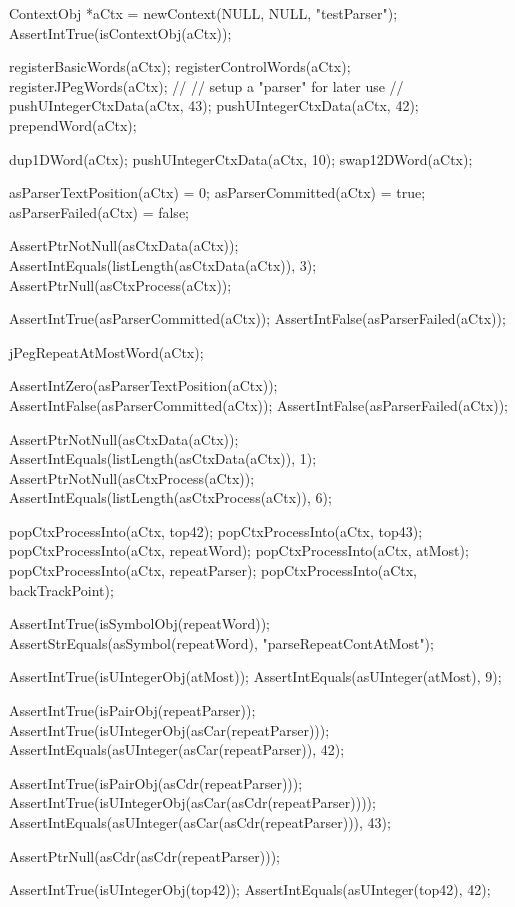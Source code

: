 \startCTest
  ContextObj *aCtx = newContext(NULL, NULL, "testParser");
  AssertIntTrue(isContextObj(aCtx));
  
  registerBasicWords(aCtx);
  registerControlWords(aCtx);
  registerJPegWords(aCtx);
  //
  // setup a "parser" for later use
  //
  pushUIntegerCtxData(aCtx, 43);
  pushUIntegerCtxData(aCtx, 42);
  prependWord(aCtx);
  
  dup1DWord(aCtx);
  pushUIntegerCtxData(aCtx, 10);
  swap12DWord(aCtx);
  
  asParserTextPosition(aCtx) = 0;
  asParserCommitted(aCtx)    = true;
  asParserFailed(aCtx)       = false;
  
  AssertPtrNotNull(asCtxData(aCtx));
  AssertIntEquals(listLength(asCtxData(aCtx)), 3);
  AssertPtrNull(asCtxProcess(aCtx));
  
  AssertIntTrue(asParserCommitted(aCtx));
  AssertIntFalse(asParserFailed(aCtx));
  
  jPegRepeatAtMostWord(aCtx);
  
  AssertIntZero(asParserTextPosition(aCtx));
  AssertIntFalse(asParserCommitted(aCtx));
  AssertIntFalse(asParserFailed(aCtx));
  
  AssertPtrNotNull(asCtxData(aCtx));
  AssertIntEquals(listLength(asCtxData(aCtx)), 1);
  AssertPtrNotNull(asCtxProcess(aCtx));
  AssertIntEquals(listLength(asCtxProcess(aCtx)), 6);
    
  popCtxProcessInto(aCtx, top42);
  popCtxProcessInto(aCtx, top43);
  popCtxProcessInto(aCtx, repeatWord);
  popCtxProcessInto(aCtx, atMost);
  popCtxProcessInto(aCtx, repeatParser);
  popCtxProcessInto(aCtx, backTrackPoint);
  
  AssertIntTrue(isSymbolObj(repeatWord));
  AssertStrEquals(asSymbol(repeatWord), "parseRepeatContAtMost");
  
  AssertIntTrue(isUIntegerObj(atMost));
  AssertIntEquals(asUInteger(atMost), 9);
  
  AssertIntTrue(isPairObj(repeatParser));
  AssertIntTrue(isUIntegerObj(asCar(repeatParser)));
  AssertIntEquals(asUInteger(asCar(repeatParser)), 42);
  
  AssertIntTrue(isPairObj(asCdr(repeatParser)));
  AssertIntTrue(isUIntegerObj(asCar(asCdr(repeatParser))));
  AssertIntEquals(asUInteger(asCar(asCdr(repeatParser))), 43);
  
  AssertPtrNull(asCdr(asCdr(repeatParser)));
  
  AssertIntTrue(isUIntegerObj(top42));
  AssertIntEquals(asUInteger(top42), 42);  

